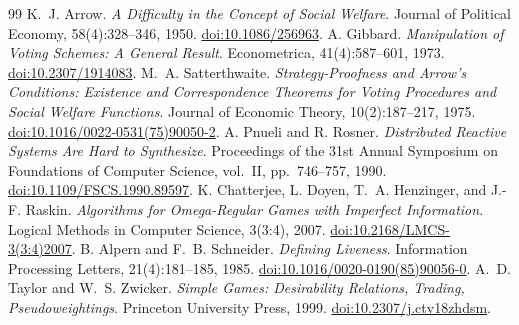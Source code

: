 \documentclass[11pt,oneside,openany]{book}
\numberwithin{equation}{section}
\begin{document}
\begin{thebibliography}{99}
 K.~J. Arrow. \emph{A Difficulty in the Concept of Social Welfare}. Journal of Political Economy, 58(4):328--346, 1950. \href{https://doi.org/10.1086/256963}{doi:10.1086/256963}.
 A. Gibbard. \emph{Manipulation of Voting Schemes: A General Result}. Econometrica, 41(4):587--601, 1973. \href{https://doi.org/10.2307/1914083}{doi:10.2307/1914083}.
 M.~A. Satterthwaite. \emph{Strategy-Proofness and Arrow's Conditions: Existence and Correspondence Theorems for Voting Procedures and Social Welfare Functions}. Journal of Economic Theory, 10(2):187--217, 1975. \href{https://doi.org/10.1016/0022-0531(75)90050-2}{doi:10.1016/0022-0531(75)90050-2}.
 A. Pnueli and R. Rosner. \emph{Distributed Reactive Systems Are Hard to Synthesize}. Proceedings of the 31st Annual Symposium on Foundations of Computer Science, vol.~II, pp.~746--757, 1990. \href{https://doi.org/10.1109/FSCS.1990.89597}{doi:10.1109/FSCS.1990.89597}.
 K. Chatterjee, L. Doyen, T.~A. Henzinger, and J.-F. Raskin. \emph{Algorithms for Omega-Regular Games with Imperfect Information}. Logical Methods in Computer Science, 3(3:4), 2007. \href{https://doi.org/10.2168/LMCS-3(3:4)2007}{doi:10.2168/LMCS-3(3:4)2007}.
 B. Alpern and F.~B. Schneider. \emph{Defining Liveness}. Information Processing Letters, 21(4):181--185, 1985. \href{https://doi.org/10.1016/0020-0190(85)90056-0}{doi:10.1016/0020-0190(85)90056-0}.
 A.~D. Taylor and W.~S. Zwicker. \emph{Simple Games: Desirability Relations, Trading, Pseudoweightings}. Princeton University Press, 1999. \href{https://doi.org/10.2307/j.ctv18zhdsm}{doi:10.2307/j.ctv18zhdsm}.


\end{thebibliography}
\end{document}
